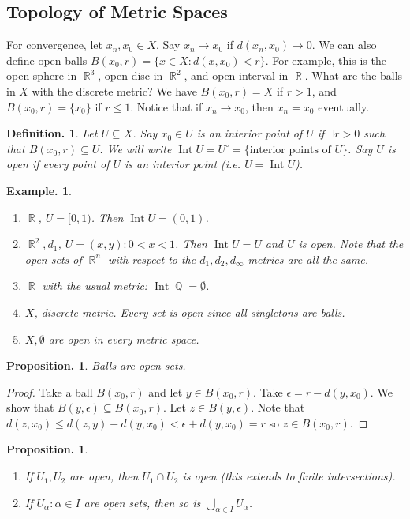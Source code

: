 \documentclass[11pt, a4paper]{memoir}
\DeclareMathOperator{\Q}{{\mathbb{Q}}}
\DeclareMathOperator{\R}{{\mathbb{R}}}
\theoremstyle{change}
\newtheorem{proposition}[theorem]{Proposition.}
\theoremstyle{plain}
\theoremstyle{nonumberplain}
\newtheorem{definition}{Definition.}
\newtheorem{example}{Example.}
\newtheorem{proof}{Proof}
\DeclareMathOperator{\Int}{Int}
\numberwithin{equation}{section}
\begin{document}
\subsection{Topology of Metric Spaces}
For convergence, let $x_n,x_0\in X$. Say $x_n\to x_0$ if $d(x_n,x_0)\to 0$.
We can also define open balls $B(x_0,r)=\{x\in X:d(x,x_0)<r\}$. For example, this is the open
sphere in $\R^3$, open disc in $\R^2$, and open interval in $\R$. What are the balls in $X$ with the discrete metric?
We have $B(x_0,r)=X$ if $r>1$, and $B(x_0,r)=\{x_0\}$ if $r\leq 1$. Notice that if $x_n\to x_0$, then $x_n=x_0$ eventually.
\begin{definition}
    Let $U\subseteq X$. Say $x_0\in U$ is an interior point of $U$ if $\exists r>0$ such that $B(x_0,r)\subseteq U$.
    We will write $\Int U=U^\circ=\{\text{interior points of $U$}\}$. Say $U$ is open if every point of $U$ is an
    interior point (i.e. $U=\Int U$).
\end{definition}
\begin{example}\hspace{1cm}
    \begin{enumerate}
        \item $\R$, $U=[0,1)$. Then $\Int U=(0,1)$.
        \item $\R^2,d_1$, $U=(x,y):0<x<1$. Then $\Int U=U$ and $U$ is open. Note that the open sets of $\R^n$ with respect
            to the $d_1,d_2,d_\infty$ metrics are all the same.
        \item $\R$ with the usual metric: $\Int\Q=\emptyset$.
        \item $X$, discrete metric. Every set is open since all singletons are balls.
        \item $X,\emptyset$ are open in every metric space.
    \end{enumerate}
\end{example}
\begin{proposition}
    Balls are open sets.
\end{proposition}
\begin{proof}
    Take a ball $B(x_0,r)$ and let $y\in B(x_0,r)$. Take $\epsilon=r-d(y,x_0)$. We show that $B(y,\epsilon)\subseteq B(x_0,r)$.
    Let $z\in B(y,\epsilon)$. Note that $d(z,x_0)\leq d(z,y)+d(y,x_0)<\epsilon+d(y,x_0)=r$ so $z\in B(x_0,r)$.
\end{proof}
\begin{proposition}
    \begin{enumerate}
        \item If $U_1,U_2$ are open, then $U_1\cap U_2$ is open (this extends to finite intersections).
        \item If $U_\alpha:\alpha\in I$ are open sets, then so is $\bigcup_{\alpha\in I}U_\alpha$.
    \end{enumerate}
\end{proposition}
\end{document}
